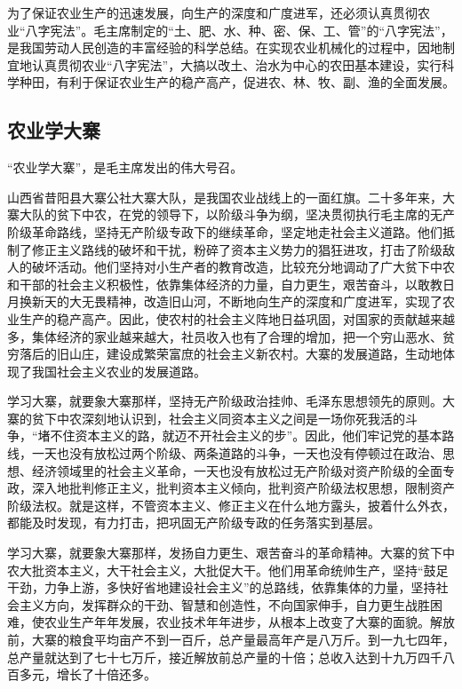 \documentclass{book}
\begin{document}
为了保证农业生产的迅速发展，向生产的深度和广度进军，还必须认真贯彻农业“八字宪法”。毛主席制定的“土、肥、水、种、密、保、工、管”的“八字宪法”，是我国劳动人民创造的丰富经验的科学总结。在实现农业机械化的过程中，因地制宜地认真贯彻农业“八字宪法”，大搞以改土、治水为中心的农田基本建设，实行科学种田，有利于保证农业生产的稳产高产，促进农、林、牧、副、渔的全面发展。

\subsection{农业学大寨}

“农业学大寨”，是毛主席发出的伟大号召。

山西省昔阳县大寨公社大寨大队，是我国农业战线上的一面红旗。二十多年来，大寨大队的贫下中农，在党的领导下，以阶级斗争为纲，坚决贯彻执行毛主席的无产阶级革命路线，坚持无产阶级专政下的继续革命，坚定地走社会主义道路。他们抵制了修正主义路线的破坏和干扰，粉碎了资本主义势力的猖狂进攻，打击了阶级敌人的破坏活动。他们坚持对小生产者的教育改造，比较充分地调动了广大贫下中农和干部的社会主义积极性，依靠集体经济的力量，自力更生，艰苦奋斗，以敢教日月换新天的大无畏精神，改造旧山河，不断地向生产的深度和广度进军，实现了农业生产的稳产高产。因此，使农村的社会主义阵地日益巩固，对国家的贡献越来越多，集体经济的家业越来越大，社员收入也有了合理的增加，把一个穷山恶水、贫穷落后的旧山庄，建设成繁荣富庶的社会主义新农村。大寨的发展道路，生动地体现了我国社会主义农业的发展道路。

学习大寨，就要象大寨那样，坚持无产阶级政治挂帅、毛泽东思想领先的原则。大寨的贫下中农深刻地认识到，社会主义同资本主义之间是一场你死我活的斗争，“堵不住资本主义的路，就迈不开社会主义的步”。因此，他们牢记党的基本路线，一天也没有放松过两个阶级、两条道路的斗争，一天也没有停顿过在政治、思想、经济领域里的社会主义革命，一天也没有放松过无产阶级对资产阶级的全面专政，深入地批判修正主义，批判资本主义倾向，批判资产阶级法权思想，限制资产阶级法权。就是这样，不管资本主义、修正主义在什么地方露头，披着什么外衣，都能及时发现，有力打击，把巩固无产阶级专政的任务落实到基层。

学习大寨，就要象大寨那样，发扬自力更生、艰苦奋斗的革命精神。大寨的贫下中农大批资本主义，大干社会主义，大批促大干。他们用革命统帅生产，坚持“鼓足干劲，力争上游，多快好省地建设社会主义”的总路线，依靠集体的力量，坚持社会主义方向，发挥群众的干劲、智慧和创造性，不向国家伸手，自力更生战胜困难，使农业生产年年发展，农业技术年年进步，从根本上改变了大寨的面貌。解放前，大寨的粮食平均亩产不到一百斤，总产量最高年产是八万斤。到一九七四年，总产量就达到了七十七万斤，接近解放前总产量的十倍；总收入达到十九万四千八百多元，增长了十倍还多。
\end{document}
